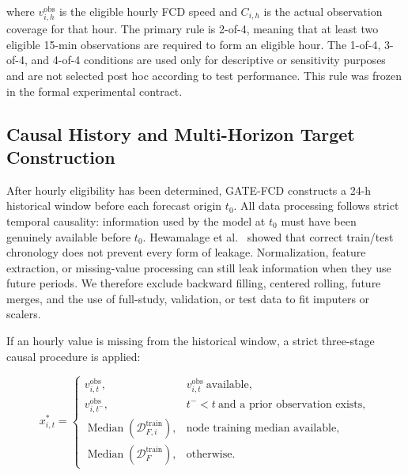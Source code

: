 \documentclass[pdflatex,sn-mathphys-num,iicol]{sn-jnl}
\begin{document}
where $v^{\mathrm{obs}}_{i,h}$ is the eligible hourly FCD speed and $C_{i,h}$ is the actual observation coverage for that hour. The primary rule is 2-of-4, meaning that at least two eligible 15-min observations are required to form an eligible hour. The 1-of-4, 3-of-4, and 4-of-4 conditions are used only for descriptive or sensitivity purposes and are not selected post hoc according to test performance. This rule was frozen in the formal experimental contract.


\subsection{Causal History and Multi-Horizon Target Construction}
\label{subsec:causal-history}

After hourly eligibility has been determined, GATE-FCD constructs a 24-h historical window before each forecast origin $t_0$. All data processing follows strict temporal causality: information used by the model at $t_0$ must have been genuinely available before $t_0$. Hewamalage et al.~\cite{Hewamalage2023ForecastEvaluation} showed that correct train/test chronology does not prevent every form of leakage. Normalization, feature extraction, or missing-value processing can still leak information when they use future periods. We therefore exclude backward filling, centered rolling, future merges, and the use of full-study, validation, or test data to fit imputers or scalers.

If an hourly value is missing from the historical window, a strict three-stage causal procedure is applied:

\begin{equation}
x^{*}_{i,t}
=
\begin{cases}
v^{\mathrm{obs}}_{i,t},
&
v^{\mathrm{obs}}_{i,t}\ \text{available},
\\[4pt]

v^{\mathrm{obs}}_{i,t^{-}},
&
t^{-}<t\ \text{and a prior observation exists},
\\[4pt]

\operatorname{Median}\!\left(\mathcal{D}^{\mathrm{train}}_{F,i}\right),
&
\text{node training median available},
\\[4pt]

\operatorname{Median}\!\left(\mathcal{D}^{\mathrm{train}}_{F}\right),
&
\text{otherwise}.
\end{cases}
\label{eq:causal-imputation}
\end{equation}
\end{document}
